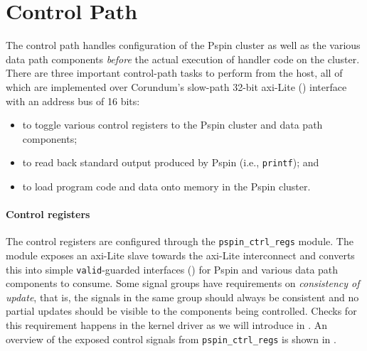 
\section{Control Path} \label{sec:hw-control}

The control path handles configuration of the P\acs{spin} cluster as well as the various data path components \emph{before} the actual execution of handler code on the cluster.  There are three important control-path tasks to perform from the host, all of which are implemented over Corundum's slow-path 32-bit \ac{axi}-Lite () interface with an address bus of 16 bits:

\begin{itemize}
    \item to toggle various control registers to the P\acs{spin} cluster and data path components;
    \item to read back standard output produced by P\acs{spin} (i.e., \texttt{printf}); and
    \item to load program code and data onto memory in the P\acs{spin} cluster.
\end{itemize}

\paragraph{Control registers} The control registers are configured through the \texttt{pspin\_\-ctrl\_\-regs} module.  The module exposes an \ac{axi}-Lite slave towards the \ac{axi}-Lite interconnect and converts this into simple \texttt{valid}-guarded interfaces () for P\acs{spin} and various data path components to consume.  Some signal groups have requirements on \emph{consistency of update}, that is, the signals in the same group should always be consistent and no partial updates should be visible to the components being controlled.  Checks for this requirement happens in the kernel driver as we will introduce in .  An overview of the exposed control signals from \texttt{pspin\_\-ctrl\_\-regs} is shown in .

